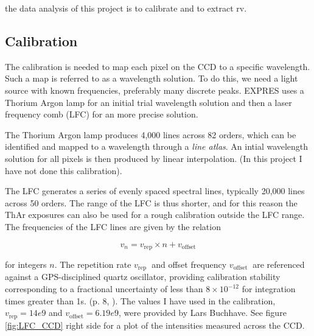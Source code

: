  the data analysis of this project is to calibrate and to extract rv.

\subsection{Calibration} 

    The calibration is needed to map each pixel on the CCD to a specific wavelength. Such a map is referred to as a wavelength solution. To do this, we need a light source with known frequencies, preferably many discrete peaks. EXPRES uses a Thorium Argon lamp for an initial trial wavelength solution and then a laser frequency comb (LFC) for an more precise solution.
    
    The Thorium Argon lamp produces 4,000 lines across 82 orders, which can be identified and mapped to a wavelength through a \emph{line atlas}. An intial wavelength solution for all pixels is then produced by linear interpolation. (In this project I have not done this calibration).

    The LFC generates a series of evenly spaced spectral lines, typically 20,000 lines across 50 orders. The range of the LFC is thus shorter, and for this reason the ThAr exposures can also be used for a rough calibration outside the LFC range. The frequencies of the LFC lines are given by the relation
    
    \begin{equation}
        \label{eq:LFC_freq_eq}
        v_{n}=v_{\text{rep}} \times n+v_{\text{offset}}
    \end{equation}

    for integers $n$. The repetition rate $v_{\text {rep }}$ and offset frequency $v_{\text {offset }}$ are referenced against a GPS-disciplined quartz oscillator, providing calibration stability corresponding to a fractional uncertainty of less than $8 \times 10^{-12}$ for integration times greater than 1s. (p. 8, \cite{first_RV_from_EXPRES}). The values I have used in the calibration, $v_{\text{rep}} = 14e9$ and $v_{\text{offset}} = 6.19e9$, were provided by Lars Buchhave. See figure \ref{fig:LFC_CCD} right side for a plot of the intensities measured across the CCD.


